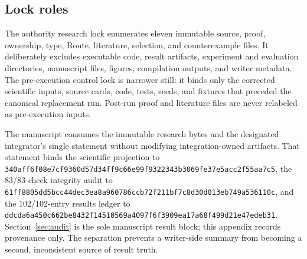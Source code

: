 \subsection{Lock roles}

The authority research lock enumerates eleven immutable source, proof,
ownership, type, Route, literature, selection, and counterexample files.  It
deliberately excludes executable code, result artifacts, experiment and
evaluation directories, manuscript files, figures, compilation outputs, and
writer metadata.  The pre-execution control lock is narrower still: it binds
only the corrected scientific inputs, source cards, code, tests, seeds, and
fixtures that preceded the canonical replacement run.  Post-run proof and
literature files are never relabeled as pre-execution inputs.

The manuscript consumes the immutable research bytes and the designated
integrator's single  statement without
modifying integration-owned artifacts.  That statement binds the scientific
projection to
\nolinkurl{340aff6f08e7cf9360d57d34ff9c66e99f9322343b3069fe37e5acc2f55aa7c5},
the 83/83-check integrity audit to
\nolinkurl{61ff8805dd5bcc44dec3ea8a960786ccb72f211bf7c8d30d013eb749a536110c},
and the 102/102-entry results ledger to
\nolinkurl{ddcda6a450c662be8432f14510569a4097f6f3909ea17a68f499d21e47edeb31}.
Section~\ref{sec:audit} is the sole manuscript result block; this appendix
records provenance only.  The separation prevents a writer-side summary from
becoming a second, inconsistent source of result truth.
